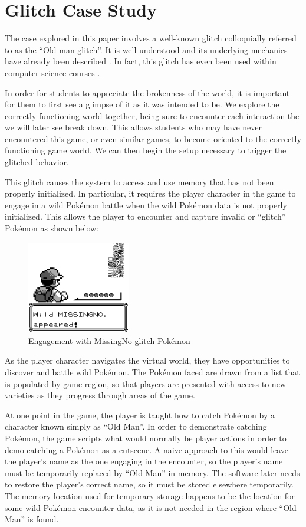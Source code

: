 \documentclass[letterpaper]{article}
\begin{document}
\section{Glitch Case Study}
The case explored in this paper involves a well-known glitch colloquially referred to as the ``Old man glitch''. It is well understood and its underlying mechanics have already been described \cite{bulbapedia2005} \cite{scrumpy2016missing}. In fact, this glitch has even been used within computer science courses \cite{rjwalls2022}.

In order for students to appreciate the brokenness of the world, it is important for them to first see a glimpse of it as it was intended to be. We explore the correctly functioning world together, being sure to encounter each interaction the we will later see break down. This allows students who may have never encountered this game, or even similar games, to become oriented to the correctly functioning game world. We can then begin the setup necessary to trigger the glitched behavior.

This glitch causes the system to access and use memory that has not been properly initialized. In particular, it requires the player character in the game to engage in a wild Pokémon battle when the wild Pokémon data is not properly initialized. This allows the player to encounter and capture invalid or ``glitch'' Pokémon as shown below:

\begin{figure}[h!]
    \centering
    \includegraphics[width=0.4\textwidth]{missingno.png}
    \caption{Engagement with MissingNo glitch Pokémon}
\end{figure}

As the player character navigates the virtual world, they have opportunities to discover and battle wild Pokémon. The Pokémon faced are drawn from a list that is populated by game region, so that players are presented with access to new varieties as they progress through areas of the game.

At one point in the game, the player is taught how to catch Pokémon by a character known simply as ``Old Man''. In order to demonstrate catching Pokémon, the game scripts what would normally be player actions in order to demo catching a Pokémon as a cutscene. A naive approach to this would leave the player's name as the one engaging in the encounter, so the player's name must be temporarily replaced by ``Old Man'' in memory. The software later needs to restore the player's correct name, so it must be stored elsewhere temporarily. The memory location used for temporary storage happens to be the location for some wild Pokémon encounter data, as it is not needed in the region where ``Old Man'' is found.
\end{document}
